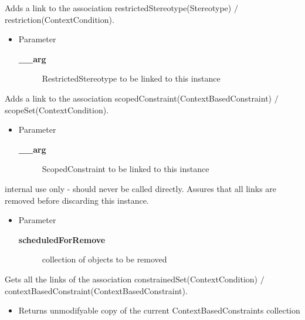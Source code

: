 \begin{desc}Adds a link to the association restrictedStereotype(Stereotype)
 $/$ restriction(ContextCondition).
\begin{itemize}
\item{Parameter
  \begin{description}
   \item[{\bf \_\_arg}]{RestrictedStereotype to be linked to this instance}
  \end{description}}
\end{itemize}
\end{desc}

\begin{desc}Adds a link to the association scopedConstraint(ContextBasedConstraint)
 $/$ scopeSet(ContextCondition).
\begin{itemize}
\item{Parameter
  \begin{description}
   \item[{\bf \_\_arg}]{ScopedConstraint to be linked to this instance}
  \end{description}}
\end{itemize}
\end{desc}

\begin{desc}internal use only - should never be called directly.
 Assures that all links are removed before
 discarding this instance.
\begin{itemize}
\item{Parameter
  \begin{description}
   \item[{\bf scheduledForRemove}]{collection of objects to be removed}
  \end{description}}
\end{itemize}
\end{desc}

\begin{desc}Gets all the links of the association constrainedSet(ContextCondition)
 $/$ contextBasedConstraint(ContextBasedConstraint).
\begin{itemize}
\item{Returns unmodifyable copy of the current ContextBasedConstraints collection }
\end{itemize}
\end{desc}

